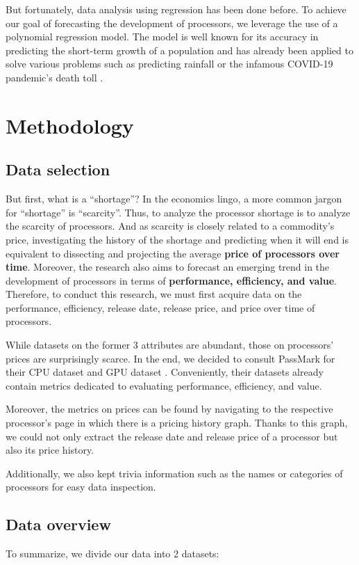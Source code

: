 \documentclass[conference]{IEEEtran}
\begin{document}
But fortunately, data analysis using regression has been done before.
To achieve our goal of forecasting the development of
processors, we leverage the use of a polynomial regression model. The model
is well known for its accuracy in predicting the short-term growth of a
population and has already been applied to solve various problems such as
predicting rainfall \cite{Jany:2016} or the infamous COVID-19 pandemic's
death toll \cite{Debanjan:2020}.

\section{Methodology}
\subsection{Data selection}
But first, what is a ``shortage''? In the economics lingo, a more common
jargon for ``shortage'' is ``scarcity''. Thus, to analyze the processor
shortage is to analyze the scarcity of processors. And as scarcity is closely
related to a commodity's price, investigating the history of the shortage and
predicting when it will end is equivalent to dissecting and projecting the
average \textbf{price of processors over time}. Moreover, the research also
aims to forecast an emerging trend in the development of processors in terms of
\textbf{performance, efficiency, and value}. Therefore, to
conduct this research, we must first acquire data on the performance,
efficiency, release date, release price, and price over time of processors.

While datasets on the former 3 attributes are abundant, those
on processors' prices are surprisingly scarce. In the end, we decided to
consult PassMark for their CPU dataset \cite{PassMarkCPU:2023} and GPU dataset
\cite{PassMarkGPU:2023}. Conveniently, their datasets already contain metrics
dedicated to evaluating performance, efficiency, and value.

Moreover, the metrics on prices can be found by navigating to the respective
processor's page in which there is a pricing history graph. Thanks to this
graph, we could not only extract the release date and release price of a
processor but also its price history.

Additionally, we also kept trivia information such as the names or categories
of processors for easy data inspection.

\subsection{Data overview}
To summarize, we divide our data into 2 datasets:
\end{document}
